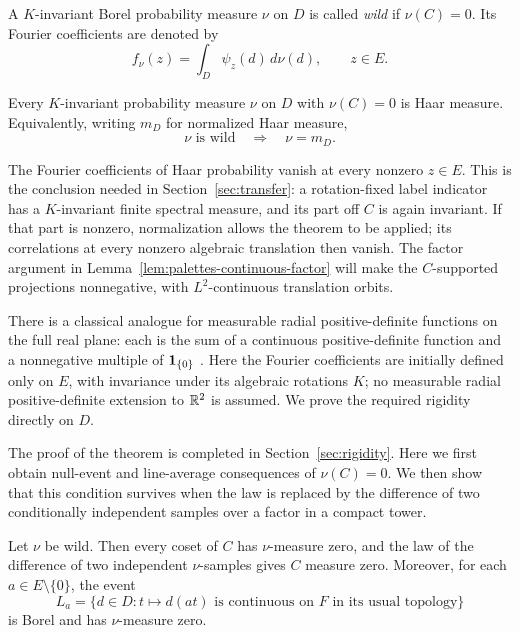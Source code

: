 \begin{definition}\label{def:spectral-wild}
A $K$-invariant Borel probability measure $\nu$ on $D$ is called
\emph{wild} if $\nu(C)=0$. Its Fourier coefficients are denoted by
\[
 f_\nu(z)=\int_D\psi_z(d)\,d\nu(d),\qquad z\in E.
\]
\end{definition}

\begin{theorem}\label{thm:rigidity}
Every $K$-invariant probability measure $\nu$ on $D$ with $\nu(C)=0$
is Haar measure. Equivalently, writing $m_D$ for normalized Haar measure,
\begin{equation}\label{eq:source-3}
 \nu\text{ is wild}\quad\Longrightarrow\quad\nu=m_D.
\end{equation}
\end{theorem}

The Fourier coefficients of Haar probability vanish at every nonzero
$z\in E$.  This is the conclusion needed in Section~\ref{sec:transfer}:
a rotation-fixed label indicator has a $K$-invariant finite spectral
measure, and its part off $C$ is again invariant.  If that part is
nonzero, normalization allows the theorem to be applied; its correlations
at every nonzero algebraic translation then vanish.  The factor argument in
Lemma~\ref{lem:palettes-continuous-factor} will make the $C$-supported
projections nonnegative, with $L^2$-continuous translation orbits.

There is a classical analogue for measurable radial positive-definite
functions on the full real plane: each is the sum of a continuous
positive-definite function and a nonnegative multiple of
$\mathbf 1_{\{0\}}$ \citep{Crum1956,GneitingSasvari1999}.
Here the Fourier coefficients are initially defined only on $E$, with
invariance under its algebraic rotations $K$; no measurable radial
positive-definite extension to $\mathbb R^2$ is assumed.
We prove the required rigidity directly on $D$.

The proof of the theorem is completed in Section~\ref{sec:rigidity}.
Here we first obtain null-event and line-average consequences of
$\nu(C)=0$.  We then show that this condition survives when the law is
replaced by the difference of two conditionally independent samples
over a factor in a compact tower.

\begin{lemma}\label{lem:spectral-null-events}
Let $\nu$ be wild. Then every coset of $C$ has $\nu$-measure zero, and
the law of the difference of two independent $\nu$-samples gives $C$
measure zero. Moreover, for each $a\in E\setminus\{0\}$, the event
\[
 L_a=\{d\in D:t\mapsto d(at)\text{ is continuous on }F
                 \text{ in its usual topology}\}
\]
is Borel and has $\nu$-measure zero.
\end{lemma}

